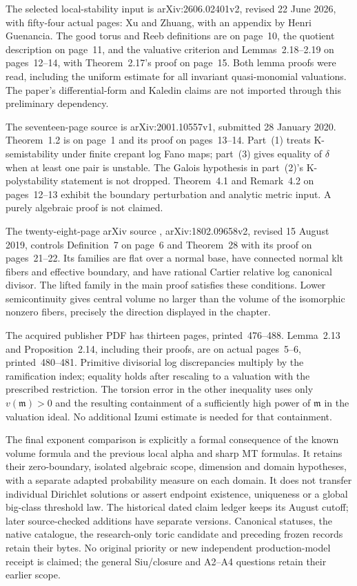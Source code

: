 The selected local-stability input
\cite{XuZhuang26StableFormsV2} is arXiv:2606.02401v2,
revised 22 June 2026, with fifty-four actual pages:
Xu and Zhuang, with an appendix by Henri Guenancia.
The good torus and Reeb definitions are on page~10,
the quotient description on page~11, and the
valuative criterion and Lemmas~2.18--2.19 on
pages~12--14, with Theorem~2.17's proof on page~15.
Both lemma proofs were read, including the uniform
estimate for all invariant quasi-monomial valuations.
The paper's differential-form and Kaledin claims
are not imported through this preliminary dependency.

The seventeen-page source
\cite{LiuZhu20EquivariantV1} is arXiv:2001.10557v1,
submitted 28 January 2020. Theorem~1.2 is on page~1
and its proof on pages~13--14. Part~(1) treats
K-semistability under finite crepant log Fano maps;
part~(3) gives equality of $\delta$ when at least
one pair is unstable. The Galois hypothesis in
part~(2)'s K-polystability statement is not dropped.
Theorem~4.1 and Remark~4.2 on pages~12--13 exhibit
the boundary perturbation and analytic metric
input. A purely algebraic proof is not claimed.

The twenty-eight-page arXiv source
\cite{BlumLiu19LowerSemiV2}, arXiv:1802.09658v2,
revised 15 August 2019, controls Definition~7 on
page~6 and Theorem~28 with its proof on pages~21--22.
Its families are flat over a normal base, have
connected normal klt fibers and effective boundary,
and have rational Cartier relative log canonical
divisor. The lifted family in the main proof satisfies
these conditions. Lower semicontinuity gives central
volume no larger than the volume of the isomorphic
nonzero fibers, precisely the direction displayed
in the chapter.

The acquired publisher PDF
\cite{DorschLazic15FiniteDiscrepancyPublished} has
thirteen pages, printed~476--488. Lemma~2.13 and
Proposition~2.14, including their proofs, are on
actual pages~5--6, printed~480--481. Primitive
divisorial log discrepancies multiply by the
ramification index; equality holds after rescaling
to a valuation with the prescribed restriction.
The torsion error in the other inequality uses
only $v(\mathfrak m)>0$ and the resulting containment
of a sufficiently high power of $\mathfrak m$ in
the valuation ideal. No additional Izumi estimate
is needed for that containment.

The final exponent comparison is explicitly a
formal consequence of the known volume formula
and the previous local alpha and sharp MT
formulas. It retains their zero-boundary,
isolated algebraic scope, dimension and domain
hypotheses, with a separate adapted probability
measure on each domain. It does not transfer
individual Dirichlet solutions or assert
endpoint existence, uniqueness or a global
big-class threshold law. The historical dated
claim ledger keeps its August cutoff; later
source-checked additions have separate versions.
Canonical statuses, the native catalogue,
the research-only toric candidate and preceding
frozen records retain their bytes. No original
priority or new independent production-model
receipt is claimed; the general Siu/closure and
A2--A4 questions retain their earlier scope.

